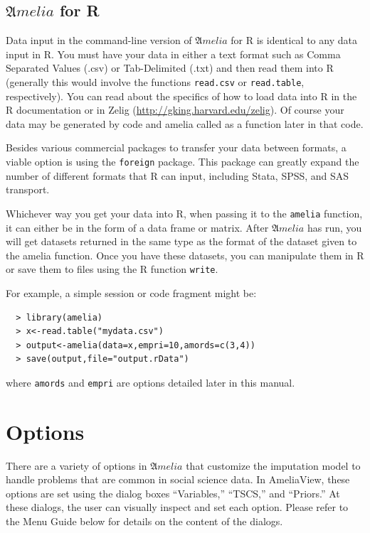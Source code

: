 \documentclass[12pt,titlepage]{article}
\newcommand{\Amelia}{\ensuremath{\mathfrak Amelia} }
\begin{document}
\subsection{\Amelia for R}
\label{sec:data-r}
Data input in the command-line version of ${\mathfrak Amelia}$ for R
is identical to any data input in R.  You must have your data in
either a text format such as Comma Separated Values (.csv) or
Tab-Delimited (.txt) and then read them into R (generally this would
involve the functions \texttt{read.csv} or \texttt{read.table},
respectively).  You can read about the specifics of how to load data
into R in the R documentation or in Zelig
(\url{http://gking.harvard.edu/zelig}).  Of course your data may be
generated by code and amelia called as a function later in that code.

Besides various commercial packages to transfer your data between
formats, a viable option is using the \texttt{foreign} package.  This
package can greatly expand the number of different formats that R can
input, including Stata, SPSS, and SAS transport.

Whichever way you get your data into R, when passing it to the
\texttt{amelia} function, it can either be in the form of a data frame
or matrix.  After ${\mathfrak Amelia}$ has run, you will get datasets
returned in the same type as the format of the dataset given to the
amelia function.  Once you have these datasets, you can manipulate
them in R or save them to files using the R function \texttt{write}.

For example, a simple session or code fragment might be:
  \begin{verbatim}
  > library(amelia)
  > x<-read.table("mydata.csv")
  > output<-amelia(data=x,empri=10,amords=c(3,4))
  > save(output,file="output.rData")
  \end{verbatim}
where \texttt{amords} and \texttt{empri} are options detailed later in
this manual.

\section{Options}
\label{sec:options}
There are a variety of options in \Amelia that customize the
imputation model to handle problems that are common in social science
data.  In AmeliaView, these options are set using the dialog boxes
``Variables,'' ``TSCS,'' and ``Priors.''  At these dialogs, the user
can visually inspect and set each option.  Please refer to the Menu
Guide below for details on the content of the dialogs.
\end{document}
